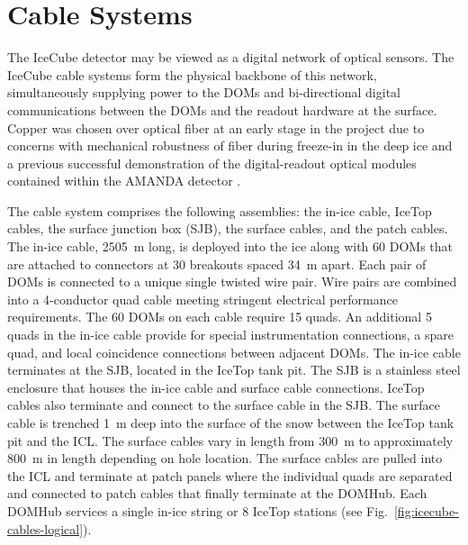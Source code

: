 
 
\section{Cable Systems}

The IceCube detector may be viewed as a digital network of optical
sensors. The IceCube cable systems form the physical backbone of this
network, simultaneously supplying power to the DOMs and bi-directional
digital communications between the DOMs and the readout hardware at the
surface. Copper was chosen over optical fiber at an early stage in the
project due to concerns with mechanical robustness of fiber during
freeze-in in the deep ice and a previous successful demonstration of the
digital-readout optical modules contained within the AMANDA detector
\cite{AMANDA:string18}. 

The cable system comprises the following assemblies: the in-ice cable,
IceTop cables, the surface junction box (SJB), the surface cables, and the patch
cables. The in-ice cable, 2505~m long, is deployed
into the ice along with 60 DOMs that are attached to connectors at 30
breakouts spaced 34~m apart. Each pair of DOMs is connected to a unique
single twisted wire pair. Wire pairs are combined into a 4-conductor quad
cable meeting stringent electrical performance requirements. The 60
DOMs on each cable require 15 quads. An additional 5 quads in the
in-ice cable provide for special instrumentation connections, a spare quad,
and local coincidence connections between adjacent DOMs. The in-ice
cable terminates at the SJB, located
in the IceTop tank pit. The SJB is a stainless steel
enclosure that houses the in-ice cable and surface cable
connections. IceTop cables also terminate and connect to the surface cable
in the SJB. The surface cable is trenched 1~m deep into the
surface of the snow between the IceTop tank pit and the ICL. The surface
cables vary in length from 300~m to approximately 800~m in length depending on hole location. The surface cables are
pulled into the ICL and terminate at patch panels where the individual
quads are separated and connected to patch cables that finally terminate at the DOMHub. Each
DOMHub services a single in-ice string or 8 IceTop stations (see
Fig.~\ref{fig:icecube-cables-logical}). 

